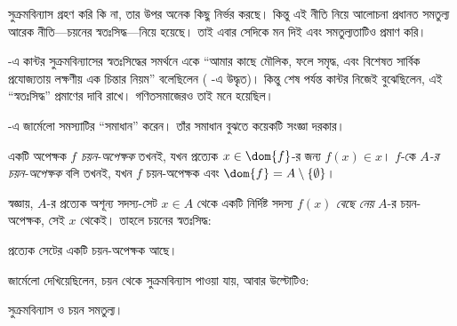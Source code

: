 \documentclass[../../../include/open-logic-section]{subfiles}
\begin{document}

সুক্রমবিন্যাস গ্রহণ করি কি না, তার উপর অনেক কিছু
নির্ভর করছে। কিন্তু এই নীতি নিয়ে আলোচনা প্রধানত
সমতুল্য আরেক নীতি—চয়নের স্বতঃসিদ্ধ—নিয়ে হয়েছে।
তাই এবার সেদিকে মন দিই এবং সমতুল্যতাটিও প্রমাণ করি।

\citeyear{Cantor1883}-এ কান্টর সুক্রমবিন্যাসের
স্বতঃসিদ্ধের সমর্থনে একে ``আমার কাছে মৌলিক, ফলে
সমৃদ্ধ, এবং বিশেষত সার্বিক প্রযোজ্যতায় লক্ষণীয় এক
চিন্তার নিয়ম'' বলেছিলেন (\citeauthor{Potter2004}
\citeyear[p.~243]{Potter2004}-এ উদ্ধৃত)। কিন্তু
শেষ পর্যন্ত কান্টর নিজেই বুঝেছিলেন, এই ``স্বতঃসিদ্ধ''
প্রমাণের দাবি রাখে। গণিতসমাজেরও তাই মনে হয়েছিল।

\citeyear{Zermelo1904}-এ জার্মেলো সমস্যাটির
``সমাধান'' করেন। তাঁর সমাধান বুঝতে কয়েকটি সংজ্ঞা দরকার।

\begin{defn}
একটি অপেক্ষক $f$ \emph{চয়ন-অপেক্ষক} তখনই, যখন
প্রত্যেক $x \in \dom{f}$-র জন্য $f(x) \in x$।
$f$-কে \emph{$A$-র চয়ন-অপেক্ষক} বলি তখনই,
যখন $f$ চয়ন-অপেক্ষক এবং
$\dom{f} = A \setminus \{\emptyset\}$।
\end{defn}

স্বজ্ঞায়, $A$-র প্রত্যেক অশূন্য সদস্য-সেট
$x \in A$ থেকে একটি নির্দিষ্ট সদস্য $f(x)$
\emph{বেছে নেয়} $A$-র চয়ন-অপেক্ষক,
সেই $x$ থেকেই।
তাহলে চয়নের স্বতঃসিদ্ধ:

\begin{axiom}[চয়ন]
	প্রত্যেক সেটের একটি চয়ন-অপেক্ষক আছে।
\end{axiom}

জার্মেলো দেখিয়েছিলেন, চয়ন থেকে সুক্রমবিন্যাস
পাওয়া যায়, আবার উল্টোটিও:

\begin{thm}[$\ZF$-এ]
সুক্রমবিন্যাস ও চয়ন সমতুল্য।
\end{thm}
\end{document}
